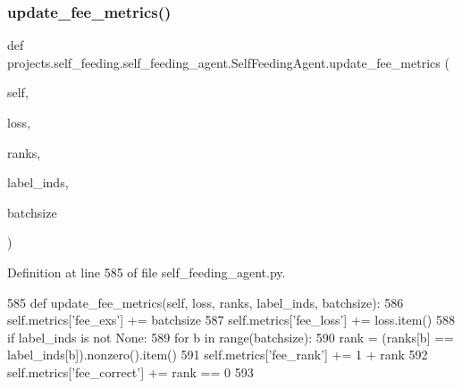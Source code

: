 \subsubsection{\texorpdfstring{update\+\_\+fee\+\_\+metrics()}{update\_fee\_metrics()}}
{\footnotesize\ttfamily def projects.\+self\+\_\+feeding.\+self\+\_\+feeding\+\_\+agent.\+Self\+Feeding\+Agent.\+update\+\_\+fee\+\_\+metrics (\begin{DoxyParamCaption}\item[{}]{self,  }\item[{}]{loss,  }\item[{}]{ranks,  }\item[{}]{label\+\_\+inds,  }\item[{}]{batchsize }\end{DoxyParamCaption})}



Definition at line 585 of file self\+\_\+feeding\+\_\+agent.\+py.


\begin{DoxyCode}
585     \textcolor{keyword}{def }update\_fee\_metrics(self, loss, ranks, label\_inds, batchsize):
586         self.metrics[\textcolor{stringliteral}{'fee\_exs'}] += batchsize
587         self.metrics[\textcolor{stringliteral}{'fee\_loss'}] += loss.item()
588         \textcolor{keywordflow}{if} label\_inds \textcolor{keywordflow}{is} \textcolor{keywordflow}{not} \textcolor{keywordtype}{None}:
589             \textcolor{keywordflow}{for} b \textcolor{keywordflow}{in} range(batchsize):
590                 rank = (ranks[b] == label\_inds[b]).nonzero().item()
591                 self.metrics[\textcolor{stringliteral}{'fee\_rank'}] += 1 + rank
592                 self.metrics[\textcolor{stringliteral}{'fee\_correct'}] += rank == 0
593 
\end{DoxyCode}
\mbox{\label{classprojects_1_1self__feeding_1_1self__feeding__agent_1_1SelfFeedingAgent_ab41a6e0b9f7ba0163ebb1152eadfdeb1}} 
